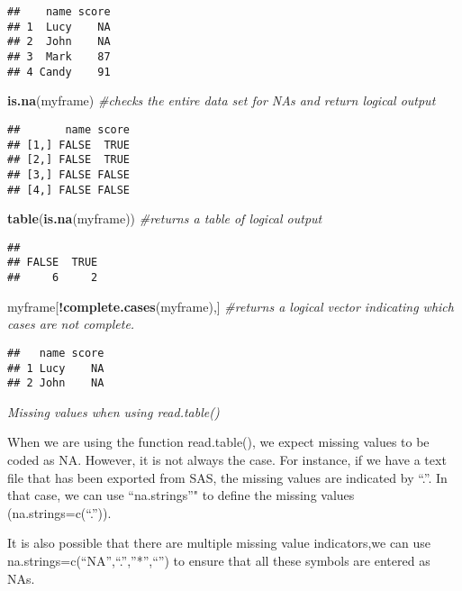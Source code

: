 \documentclass[]{book}
\newenvironment{Shaded}{\begin{snugshade}}{\end{snugshade}}
\newcommand{\KeywordTok}[1]{\textcolor[rgb]{0.13,0.29,0.53}{\textbf{#1}}}
\newcommand{\CommentTok}[1]{\textcolor[rgb]{0.56,0.35,0.01}{\textit{#1}}}
\newcommand{\OperatorTok}[1]{\textcolor[rgb]{0.81,0.36,0.00}{\textbf{#1}}}
\newcommand{\NormalTok}[1]{#1}
\theoremstyle{definition}
\theoremstyle{definition}
\theoremstyle{definition}
\theoremstyle{remark}
\begin{document}
\begin{verbatim}
##    name score
## 1  Lucy    NA
## 2  John    NA
## 3  Mark    87
## 4 Candy    91
\end{verbatim}

\begin{Shaded}
\begin{Highlighting}[]
\KeywordTok{is.na}\NormalTok{(myframe) }\CommentTok{#checks the entire data set for NAs and return logical output}
\end{Highlighting}
\end{Shaded}

\begin{verbatim}
##       name score
## [1,] FALSE  TRUE
## [2,] FALSE  TRUE
## [3,] FALSE FALSE
## [4,] FALSE FALSE
\end{verbatim}

\begin{Shaded}
\begin{Highlighting}[]
\KeywordTok{table}\NormalTok{(}\KeywordTok{is.na}\NormalTok{(myframe)) }\CommentTok{#returns a table of logical output}
\end{Highlighting}
\end{Shaded}

\begin{verbatim}
## 
## FALSE  TRUE 
##     6     2
\end{verbatim}

\begin{Shaded}
\begin{Highlighting}[]
\NormalTok{myframe[}\OperatorTok{!}\KeywordTok{complete.cases}\NormalTok{(myframe),] }\CommentTok{#returns a logical vector indicating which cases are not complete.}
\end{Highlighting}
\end{Shaded}

\begin{verbatim}
##   name score
## 1 Lucy    NA
## 2 John    NA
\end{verbatim}

\emph{Missing values when using read.table()}

When we are using the function read.table(), we expect missing values to
be coded as NA. However, it is not always the case. For instance, if we
have a text file that has been exported from SAS, the missing values are
indicated by ``.''. In that case, we can use ``na.strings''" to define
the missing values (na.strings=c(``.'')).

It is also possible that there are multiple missing value indicators,we
can use na.strings=c(``NA'',``.'',''*'',``'') to ensure that all these
symbols are entered as NAs.
\end{document}
